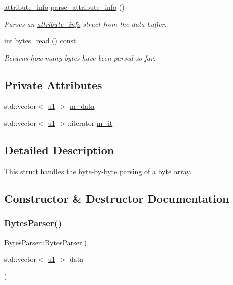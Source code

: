 \begin{DoxyCompactItemize}
\hyperlink{structattribute__info}{attribute\+\_\+info} \hyperlink{classBytesParser_ab7c84f75bd3dc2bcac74fd3ff4c6510a}{parse\+\_\+attribute\+\_\+info} ()
\begin{DoxyCompactList}\small\item\em Parses an \hyperlink{structattribute__info}{attribute\+\_\+info} struct from the data buffer. \end{DoxyCompactList}\item 
int \hyperlink{classBytesParser_a37f2e2e19b23ba08982241c7ed53b43a}{bytes\+\_\+read} () const
\begin{DoxyCompactList}\small\item\em Returns how many bytes have been parsed so far. \end{DoxyCompactList}\end{DoxyCompactItemize}
\subsection*{Private Attributes}
\begin{DoxyCompactItemize}
\item 
std\+::vector$<$ \hyperlink{types_8h_a162f47a77ee24f6f77cd8c82ccd40ab7}{u1} $>$ \hyperlink{classBytesParser_a89b64c815664cea2869895e24d3e1ed3}{m\+\_\+data}
\item 
std\+::vector$<$ \hyperlink{types_8h_a162f47a77ee24f6f77cd8c82ccd40ab7}{u1} $>$\+::iterator \hyperlink{classBytesParser_a1116068a071fde3c2b634772c806af99}{m\+\_\+it}
\end{DoxyCompactItemize}


\subsection{Detailed Description}
This struct handles the byte-\/by-\/byte parsing of a byte array. 

\subsection{Constructor \& Destructor Documentation}
\mbox{\label{classBytesParser_ac0b263b48e9a2be675442237cdc11f6c}} 
\subsubsection{\texorpdfstring{Bytes\+Parser()}{BytesParser()}}
{\footnotesize\ttfamily Bytes\+Parser\+::\+Bytes\+Parser (\begin{DoxyParamCaption}\item[{std\+::vector$<$ \hyperlink{types_8h_a162f47a77ee24f6f77cd8c82ccd40ab7}{u1} $>$}]{data }\end{DoxyParamCaption})}



